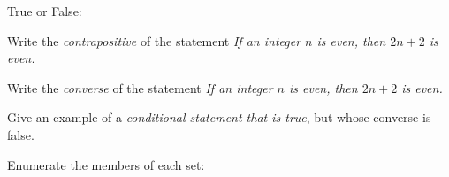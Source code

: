 \documentclass[12pt,fleqn]{exam}
\begin{document}
\begin{questions}

\question True or False:

 
 \question [10] Write the \emph{contrapositive} of the statement
    \emph{If an integer $n$ is even, then $2 n +  2$ is even.}
\begin{solution}[2.2in]
\end{solution}

 \question [10] Write the \emph{converse} of the statement
 \emph{If an integer $n$ is even, then $2 n +  2$ is even.}
\begin{solution}[2.2in]
\end{solution}

\question [10] Give an example of a \emph{conditional statement that is true}, but whose converse is false.
\begin{solution}%
\end{solution}
 
 \newpage
\question Enumerate the members of each set:

\end{questions}
\end{document}
